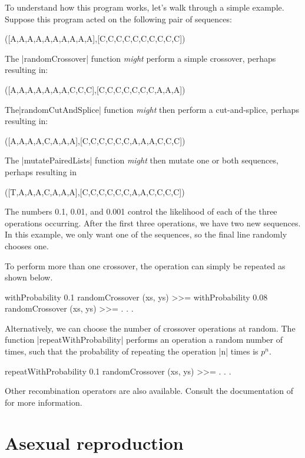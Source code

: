\documentclass[a4paper,10pt]{report}
\begin{document}
To understand how this program works,
let's walk through a simple example.
Suppose this program acted on the following pair of sequences:
\begin{code}
([A,A,A,A,A,A,A,A,A,A],[C,C,C,C,C,C,C,C,C,C])
\end{code} 
The |randomCrossover| function \emph{might} perform a simple crossover,
perhaps resulting in:
\begin{code}
([A,A,A,A,A,A,A,C,C,C],[C,C,C,C,C,C,C,A,A,A])
\end{code} 
The|randomCutAndSplice| function \emph{might} then perform a cut-and-splice, perhaps
resulting in:
\begin{code}
([A,A,A,A,C,A,A,A],[C,C,C,C,C,C,A,A,A,C,C,C])
\end{code} 
The |mutatePairedLists| function \emph{might} then mutate one or both sequences, perhaps
resulting in
\begin{code}
([T,A,A,A,C,A,A,A],[C,C,C,C,C,C,A,A,C,C,C,C])
\end{code} 
The numbers 0.1, 0.01, and 0.001 control the likelihood of each
of the three operations occurring.
After the first three operations, we have two new sequences.
In this example, we only want one of the sequences,
so the final line randomly chooses one.

To perform more than one crossover, the operation can simply be repeated
as shown below.

\begin{code}
    withProbability 0.1 randomCrossover (xs, ys) >>=
    withProbability 0.08 randomCrossover (xs, ys) >>=
    . . .
\end{code} 

Alternatively, we can choose the number of crossover operations at 
random. The function |repeatWithProbability| performs an operation a
random number of times, such that the probability of repeating the
operation |n| times is $p^n$.

\begin{code}
    repeatWithProbability 0.1 randomCrossover (xs, ys) >>=
    . . .
\end{code} 

Other recombination operators are also available.
Consult the documentation of 
for more information.

\chapter{Asexual reproduction}
\label{sec:plant}
\end{document}

